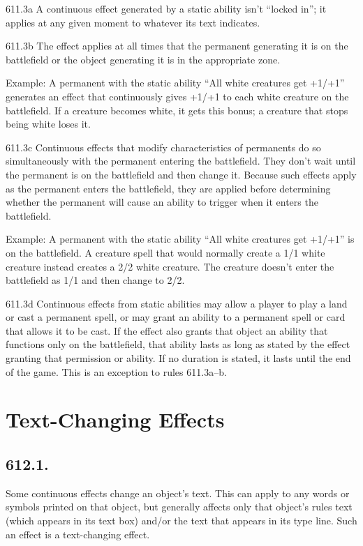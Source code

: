 611.3a A continuous effect generated by a static ability isn’t “locked in”; it applies at any given moment to whatever its text indicates.

611.3b The effect applies at all times that the permanent generating it is on the battlefield or the object generating it is in the appropriate zone.

Example: A permanent with the static ability “All white creatures get +1/+1” generates an effect that continuously gives +1/+1 to each white creature on the battlefield. If a creature becomes white, it gets this bonus; a creature that stops being white loses it.

611.3c Continuous effects that modify characteristics of permanents do so simultaneously with the permanent entering the battlefield. They don’t wait until the permanent is on the battlefield and then change it. Because such effects apply as the permanent enters the battlefield, they are applied before determining whether the permanent will cause an ability to trigger when it enters the battlefield.

Example: A permanent with the static ability “All white creatures get +1/+1” is on the battlefield. A creature spell that would normally create a 1/1 white creature instead creates a 2/2 white creature. The creature doesn’t enter the battlefield as 1/1 and then change to 2/2.

611.3d Continuous effects from static abilities may allow a player to play a land or cast a permanent spell, or may grant an ability to a permanent spell or card that allows it to be cast. If the effect also grants that object an ability that functions only on the battlefield, that ability lasts as long as stated by the effect granting that permission or ability. If no duration is stated, it lasts until the end of the game. This is an exception to rules 611.3a–b.

\section{Text-Changing Effects}
\subsection*{612.1.}
Some continuous effects change an object’s text. This can apply to any words or symbols printed on that object, but generally affects only that object’s rules text (which appears in its text box) and/or the text that appears in its type line. Such an effect is a text-changing effect.

